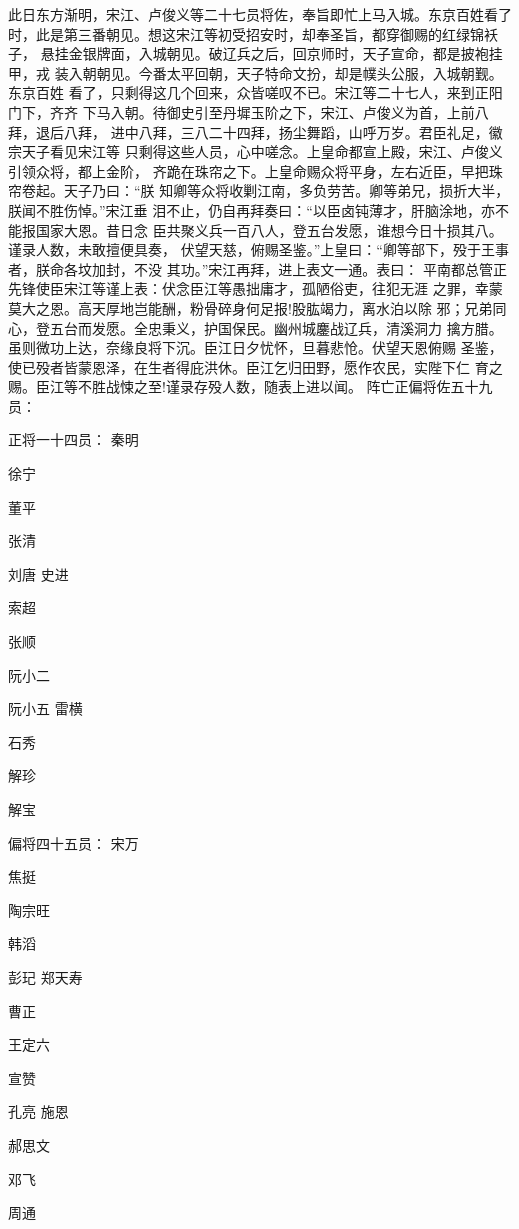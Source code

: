 此日东方渐明，宋江、卢俊义等二十七员将佐，奉旨即忙上马入城。东京百姓看了
时，此是第三番朝见。想这宋江等初受招安时，却奉圣旨，都穿御赐的红绿锦袄子，
悬挂金银牌面，入城朝见。破辽兵之后，回京师时，天子宣命，都是披袍挂甲，戎
装入朝朝见。今番太平回朝，天子特命文扮，却是幞头公服，入城朝觐。东京百姓
看了，只剩得这几个回来，众皆嗟叹不已。宋江等二十七人，来到正阳门下，齐齐
下马入朝。待御史引至丹墀玉阶之下，宋江、卢俊义为首，上前八拜，退后八拜，
进中八拜，三八二十四拜，扬尘舞蹈，山呼万岁。君臣礼足，徽宗天子看见宋江等
只剩得这些人员，心中嗟念。上皇命都宣上殿，宋江、卢俊义引领众将，都上金阶，
齐跪在珠帘之下。上皇命赐众将平身，左右近臣，早把珠帘卷起。天子乃曰：“朕
知卿等众将收剿江南，多负劳苦。卿等弟兄，损折大半，朕闻不胜伤悼。”宋江垂
泪不止，仍自再拜奏曰：“以臣卤钝薄才，肝脑涂地，亦不能报国家大恩。昔日念
臣共聚义兵一百八人，登五台发愿，谁想今日十损其八。谨录人数，未敢擅便具奏，
伏望天慈，俯赐圣鉴。”上皇曰：“卿等部下，殁于王事者，朕命各坟加封，不没
其功。”宋江再拜，进上表文一通。表曰：
平南都总管正先锋使臣宋江等谨上表：伏念臣江等愚拙庸才，孤陋俗吏，往犯无涯
之罪，幸蒙莫大之恩。高天厚地岂能酬，粉骨碎身何足报!股肱竭力，离水泊以除
邪；兄弟同心，登五台而发愿。全忠秉义，护国保民。幽州城鏖战辽兵，清溪洞力
擒方腊。虽则微功上达，奈缘良将下沉。臣江日夕忧怀，旦暮悲怆。伏望天恩俯赐
圣鉴，使已殁者皆蒙恩泽，在生者得庇洪休。臣江乞归田野，愿作农民，实陛下仁
育之赐。臣江等不胜战悚之至!谨录存殁人数，随表上进以闻。
阵亡正偏将佐五十九员：

正将一十四员：
秦明

徐宁

董平

张清

刘唐
史进

索超

张顺

阮小二

阮小五
雷横

石秀

解珍

解宝

偏将四十五员：
宋万

焦挺

陶宗旺

韩滔

彭玘
郑天寿

曹正

王定六

宣赞

孔亮
施恩

郝思文

邓飞

周通

